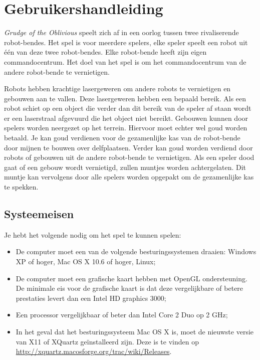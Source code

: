     \section{Gebruikershandleiding}
    \label{app:handleiding}
    \emph{Grudge of the Oblivious} speelt zich af in een oorlog tussen twee rivaliserende robot-bendes. Het spel is voor meerdere spelers, elke speler speelt een robot uit \'e\'en van deze twee robot-bendes. Elke robot-bende heeft zijn eigen commandocentrum. Het doel van het spel is om het commandocentrum van de andere robot-bende te vernietigen.

    Robots hebben krachtige lasergeweren om andere robots te vernietigen en gebouwen aan te vallen. Deze lasergeweren hebben een bepaald bereik. Als een robot schiet op een object die verder dan dit bereik van de speler af staan wordt er een laserstraal afgevuurd die het object niet bereikt. Gebouwen kunnen door spelers worden neergezet op het terrein. Hiervoor moet echter wel goud worden betaald. Je kan goud verdienen voor de gezamenlijke kas van de robot-bende door mijnen te bouwen over delfplaatsen. Verder kan goud worden verdiend door robots of gebouwen uit de andere robot-bende te vernietigen. Als een speler dood gaat of een gebouw wordt vernietigd, zullen muntjes worden achtergelaten. Dit muntje kan vervolgens door alle spelers worden opgepakt om de gezamenlijke kas te spekken.

	\subsection{Systeemeisen}
	Je hebt het volgende nodig om het spel te kunnen spelen:
	\begin{itemize}
		\item De computer moet een van de volgende besturingssystemen draaien: Windows XP of hoger, Mac OS X 10.6 of hoger, Linux;
		\item De computer moet een grafische kaart hebben met OpenGL ondersteuning. De minimale eis voor de grafische kaart is dat deze vergelijkbare of betere prestaties levert dan een Intel HD graphics 3000;
		\item Een processor vergelijkbaar of beter dan Intel Core 2 Duo op 2 GHz;
		\item In het geval dat het besturingssysteem Mac OS X is, moet de nieuwste versie van X11 of XQuartz ge\"installeerd zijn. Deze is te vinden op \url{http://xquartz.macosforge.org/trac/wiki/Releases}.
	\end{itemize}

